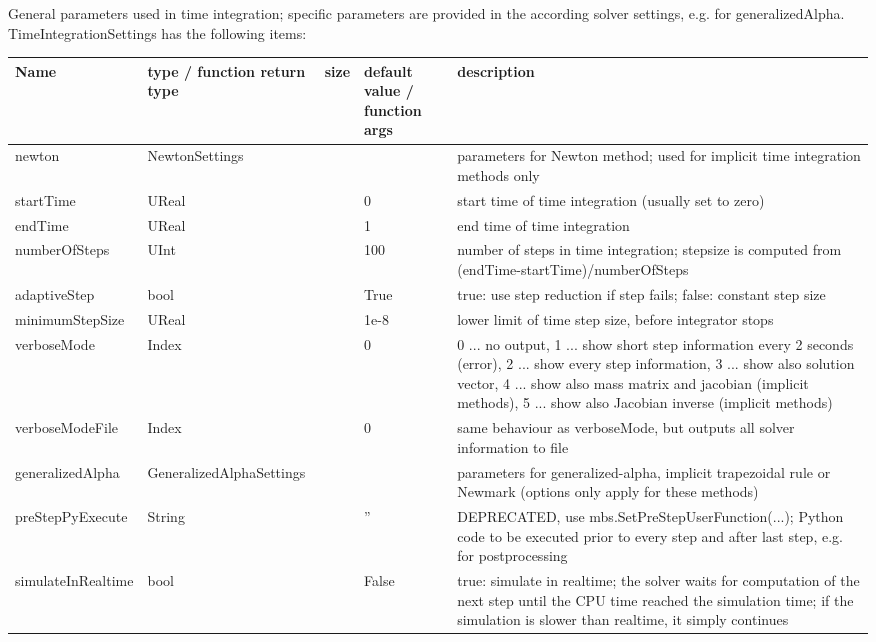  \label{sec:TimeIntegrationSettings}
General parameters used in time integration; specific parameters are provided in the according solver settings, e.g. for generalizedAlpha.\\ 
%
TimeIntegrationSettings has the following items:
\begin{center}
  \footnotesize
  \begin{longtable}{| p{4.2cm} | p{2.5cm} | p{0.3cm} | p{3.0cm} | p{6cm} |}
    \hline
    \bf Name & \bf type / function return type & \bf size & \bf default value / function args & \bf description \\ \hline
    newton &     NewtonSettings &      &      &     parameters for Newton method; used for implicit time integration methods only\\ \hline
    startTime &     UReal &      &     0 &     start time of time integration (usually set to zero)\\ \hline
    endTime &     UReal &      &     1 &     end time of time integration\\ \hline
    numberOfSteps &     UInt &      &     100 &     number of steps in time integration; stepsize is computed from (endTime-startTime)/numberOfSteps\\ \hline
    adaptiveStep &     bool &      &     True &     true: use step reduction if step fails; false: constant step size\\ \hline
    minimumStepSize &     UReal &      &     1e-8 &     lower limit of time step size, before integrator stops\\ \hline
    verboseMode &     Index &      &     0 &     0 ... no output, 1 ... show short step information every 2 seconds (error), 2 ... show every step information, 3 ... show also solution vector, 4 ... show also mass matrix and jacobian (implicit methods), 5 ... show also Jacobian inverse (implicit methods)\\ \hline
    verboseModeFile &     Index &      &     0 &     same behaviour as verboseMode, but outputs all solver information to file\\ \hline
    generalizedAlpha &     GeneralizedAlphaSettings &      &      &     parameters for generalized-alpha, implicit trapezoidal rule or Newmark (options only apply for these methods)\\ \hline
    preStepPyExecute &     String &      &     '' &     DEPRECATED, use mbs.SetPreStepUserFunction(...); Python code to be executed prior to every step and after last step, e.g. for postprocessing\\ \hline
    simulateInRealtime &     bool &      &     False &     true: simulate in realtime; the solver waits for computation of the next step until the CPU time reached the simulation time; if the simulation is slower than realtime, it simply continues\\ \hline
	  \end{longtable}
	\end{center}


